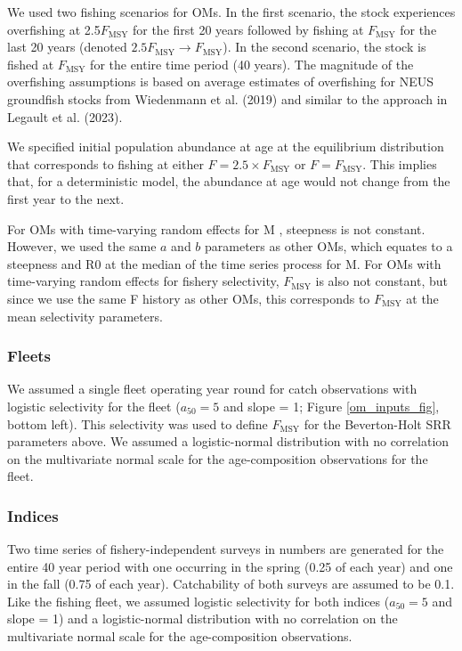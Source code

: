 \documentclass[
  12pt,
]{article}
\newcommand{\Fmsy}{\ensuremath{F_{\text{MSY}}}\xspace}
\begin{document}
We used two fishing scenarios for OMs. In the first scenario, the stock
experiences overfishing at 2.5\Fmsy for the first 20 years followed by
fishing at \Fmsy for the last 20 years (denoted
\(2.5\Fmsy \rightarrow \Fmsy\)). In the second scenario, the stock is
fished at \Fmsy for the entire time period (40 years). The magnitude of
the overfishing assumptions is based on average estimates of overfishing
for NEUS groundfish stocks from Wiedenmann et al. (2019) and similar to
the approach in Legault et al. (2023).

We specified initial population abundance at age at the equilibrium
distribution that corresponds to fishing at either
\(F = 2.5\times \Fmsy\) or \(F = \Fmsy\). This implies that, for a
deterministic model, the abundance at age would not change from the
first year to the next.

For OMs with time-varying random effects for M , steepness is not
constant. However, we used the same \(a\) and \(b\) parameters as other
OMs, which equates to a steepness and R0 at the median of the time
series process for M. For OMs with time-varying random effects for
fishery selectivity, \Fmsy is also not constant, but since we use the
same F history as other OMs, this corresponds to \Fmsy at the mean
selectivity parameters.

\hypertarget{fleets}{%
\subsubsection*{Fleets}\label{fleets}}

We assumed a single fleet operating year round for catch observations
with logistic selectivity for the fleet (\(a_{50} = 5\) and slope = 1;
Figure \ref{om_inputs_fig}, bottom left). This selectivity was used to
define \Fmsy for the Beverton-Holt SRR parameters above. We assumed a
logistic-normal distribution with no correlation on the multivariate
normal scale for the age-composition observations for the fleet.

\hypertarget{indices}{%
\subsubsection*{Indices}\label{indices}}

Two time series of fishery-independent surveys in numbers are generated
for the entire 40 year period with one occurring in the spring (0.25 of
each year) and one in the fall (0.75 of each year). Catchability of both
surveys are assumed to be 0.1. Like the fishing fleet, we assumed
logistic selectivity for both indices (\(a_{50} = 5\) and slope = 1) and
a logistic-normal distribution with no correlation on the multivariate
normal scale for the age-composition observations.
\end{document}

